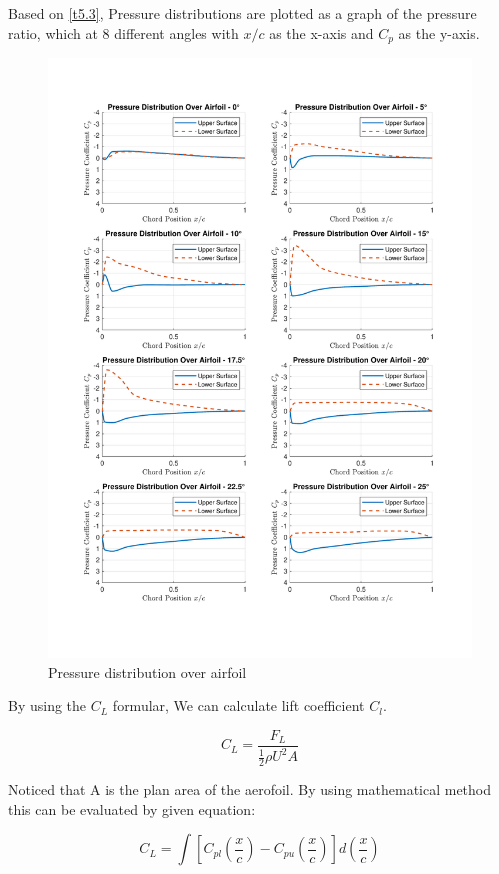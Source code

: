 Based on \autoref{t5.3}, Pressure distributions are plotted as a graph of the pressure ratio, which at 8 different angles with $x/c$ as the x-axis and $C_p$ as the y-axis.
\begin{figure}
    \centering
    \includegraphics[width=1.05\textwidth]{output.pdf}
    \caption{Pressure distribution over airfoil}
    \label{cp}
  \end{figure}


By using the $C_L$ formular, We can calculate lift coefficient $C_l$.

$$
C_{L}={\frac{F_{L}}{{\frac{1}{2}}\rho U^{2}A}}
$$

Noticed that A is the plan area of the aerofoil. By using mathematical method this can be evaluated by given equation:

$$
C_{L}=\int\left[C_{p l}\left(\frac{x}{c}\right)-C_{p u}\left(\frac{x}{c}\right)\right]d\left(\frac{x}{c}\right)
$$

